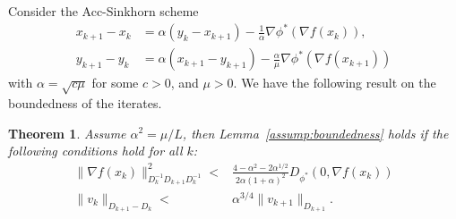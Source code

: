 \documentclass{article}
\theoremstyle{plain}
\newtheorem{theorem}{Theorem}
\theoremstyle{remark}
\begin{document}




Consider the Acc-Sinkhorn scheme
\begin{align*}
x_{k+1} - x_k &= \alpha(y_k - x_{k+1}) - \frac{1}{\alpha}\nabla \phi^*(\nabla f(x_k)),\\
y_{k+1} - y_k &= \alpha(x_{k+1} - y_{k+1}) - \frac{\alpha}{\mu}\nabla \phi^*(\nabla f(x_{k+1}))
\end{align*}
with $\alpha = \sqrt{c\mu}$ for some $c > 0$, and $\mu>0$. We have the following result on the boundedness of the iterates.
\begin{theorem}\label{thm:condition-boundedness}
Assume $\alpha^2 = \mu/L$, then Lemma~\ref{assump:boundedness} holds if the following conditions hold for all $k$:
\begin{equation}
    \begin{aligned}
\|\nabla f(x_k)\|_{D_k^{-1} D_{k+1} D_k^{-1}}^2 <{}& \frac{4-\alpha^2-2\alpha^{1/2}}{2\alpha(1+\alpha)^2}D_{\phi^*}(0,\nabla f(x_{k}))\\
\|v_k\|_{D_{k+1}-D_k} <{}& \alpha^{3/4}\|v_{k+1}\|_{D_{k+1}}.
    \end{aligned}
\end{equation}
\end{theorem}
\end{document}
